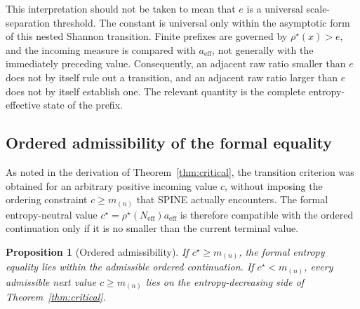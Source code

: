 \documentclass[aip,cha,reprint,superscriptaddress,floatfix]{revtex4-2}
\newtheorem{proposition}[theorem]{Proposition}
\theoremstyle{definition}
\theoremstyle{remark}
\newcommand{\Neff}{N_{\mathrm{eff}}}
\newcommand{\aeff}{a_{\mathrm{eff}}}
\newcommand{\rhostar}{\rho^{\star}}
\newcommand{\cstar}{c^{\star}}
\begin{document}
This interpretation should not be taken to mean that \(e\) is a universal scale-separation threshold. The constant is universal only within the asymptotic form of this nested Shannon transition. Finite prefixes are governed by \(\rhostar(x)>e\), and the incoming measure is compared with \(\aeff\), not generally with the immediately preceding value. Consequently, an adjacent raw ratio smaller than \(e\) does not by itself rule out a transition, and an adjacent raw ratio larger than \(e\) does not by itself establish one. The relevant quantity is the complete entropy-effective state of the prefix.

\subsection{Ordered admissibility of the formal equality}
\label{sec:admissibility}

As noted in the derivation of Theorem~\ref{thm:critical}, the transition criterion was obtained for an arbitrary positive incoming value \(c\), without imposing the ordering constraint \(c\ge m_{(n)}\) that SPINE actually encounters. The formal entropy-neutral value \(\cstar=\rhostar(\Neff)\aeff\) is therefore compatible with the ordered continuation only if it is no smaller than the current terminal value.

\begin{proposition}[Ordered admissibility]
\label{prop:ordered-admissibility}
If \(\cstar\ge m_{(n)}\), the formal entropy equality lies within the admissible ordered continuation. If \(\cstar<m_{(n)}\), every admissible next value \(c\ge m_{(n)}\) lies on the entropy-decreasing side of Theorem~\ref{thm:critical}.
\end{proposition}

\end{document}
